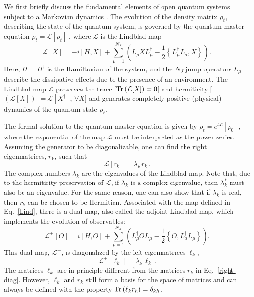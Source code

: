 \documentclass[prl,floatfix,twocolumn,superscriptaddress,showpacs,preprintnumbers,longbibliography,nofootinbib]{revtex4-1}
\begin{document}
 We first briefly discuss the fundamental elements of open quantum systems subject to a Markovian dynamics \cite{breuer2002,gardiner2004,lindblad1976,gorini1976,benatti2005,alicki2007,baumgartner2008,prosen2010,manzano2020}. The evolution of the density matrix $\rho_t$, describing the state of the quantum system, is governed by the quantum master equation $\dot{\rho}_t=\mathcal{L}[\rho_t]$ \cite{breuer2002,lindblad1976,gorini1976}, where $\mathcal{L}$ is the Lindblad map
\begin{equation}
\mathcal{L}[X]=-i[H,X]+\sum_{\mu=1}^{N_J}\left(L_\mu X L^\dagger_\mu-\frac{1}{2}\left\{L^\dagger_\mu L_\mu,X\right\}\right)\, .
\label{Lind}
\end{equation}
Here, $H=H^\dagger$ is the Hamiltonian of the system, and the $N_J$ jump operators $L_\mu$ describe the dissipative effects due to the presence of an environment. The Lindblad map $\mathcal{L}$ preserves the trace [$\Tr\left(\mathcal{L}[X]\right)=0$] and hermiticity [$\left(\mathcal{L}[X]\right)^\dagger=\mathcal{L}[X^\dagger]$, $\forall X$] and generates completely positive (physical) dynamics of the quantum state $\rho_t$.

The formal solution to the quantum master equation is given by $\rho_t=e^{t\mathcal{L}}[\rho_0]$,
where the exponential of the map $\mathcal{L}$ must be interpreted as the  power series.
Assuming the generator to be diagonalizable, one can find the right eigenmatrices, $r_k$, such that 
\begin{equation}
\mathcal{L}[r_k]=\lambda_k\, r_k\, .
\label{right-diag}
\end{equation}
The complex numbers $\lambda_k$ are the eigenvalues of the Lindblad map. Note that, due to the hermiticity-preservation of $\mathcal{L}$, if $\lambda_k$ is a complex eigenvalue, then $\lambda_k^*$ must also be an eigenvalue. For the same reason, one can also show that if $\lambda_k$ is real, then $r_k$ can be chosen to be Hermitian. Associated with the map defined in Eq.~\eqref{Lind}, there is a dual map, also called the adjoint Lindblad map, which implements the evolution of observables:
$$
\mathcal{L}^{+}[O]=i[H,O]+\sum_{\mu=1}^{N_J} \left(L^\dagger_\mu O L_\mu-\frac{1}{2}\left\{O,L^\dagger_\mu L_\mu\right\}\right).
$$
This dual map, $\mathcal{L}^+$, is diagonalized by the left eigenmatrices $\ell_k$, 
\begin{equation}
\mathcal{L}^+[\ell_k]=\lambda_k\, \ell_k\, .
\label{left-diag}
\end{equation}
The matrices $\ell_k$ are in principle different from the matrices $r_k$ in Eq.~\eqref{right-diag}. However, $\ell_k$ and $r_k$ still form a basis for the space of matrices and can always be defined with the property $\Tr\left(\ell_k r_h\right)=\delta_{kh}$. 
\end{document}
